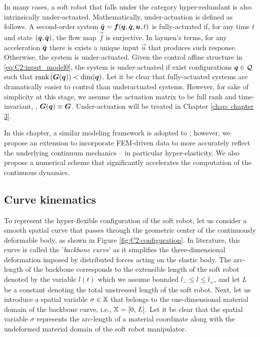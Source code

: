 {\begin{asm}
In many cases, a soft robot that falls under the category hyper-redundant is also intrinsically under-actuated. Mathematically, under-actuation is defined as follows. A second-order system $\ddot{{\boldsymbol{q}}} = \boldsymbol{f}({\boldsymbol{q}},\dot{{\boldsymbol{q}}},\boldsymbol{u},t)$ is fully-actuated if, for any time $t$ and state $({\boldsymbol{q}},\dot{{\boldsymbol{q}}})$, the flow map $\vec{f}$ is surjective. In laymen's terms, for any acceleration $\ddot{{\boldsymbol{q}}}$ there is exists a unique input $\vec{u}$ that produces such response. Otherwise, the system is under-actuated. Given the control affine structure in \eqref{eq:C2:input_model0}, the system is under-actuated if exist configurations ${\boldsymbol{q}} \in \mathcal{Q}$
such that $\textnormal{rank} \left( \boldsymbol{G}({\boldsymbol{q}}) \right) < \text{dim}({\boldsymbol{q}})$.
Let it be clear that fully-actuated systems are dramatically easier to control than underactuated systems. However, for sake of simplicity at this stage, we assume the actuation matrix to be full rank and time-invariant, \ie, $\boldsymbol{G}({\boldsymbol{q}}) \equiv \boldsymbol{G}$. Under-actuation will be treated in Chapter \ref{chap: chapter 3}.
\end{asm}

%
In this chapter, a similar modeling framework is adopted to \cite{Mochiyama2003}; however, we propose an extension to incorporate FEM-driven data to more accurately reflect the underlying continuum mechanics -- in particular hyper-elasticity. We also propose a numerical scheme that significantly accelerates the computation of the continuous dynamics.

\subsection{Curve kinematics}
\noindent To represent the hyper-flexible configuration of the soft robot, let us consider a smooth spatial curve that passes through the geometric center of the continuously deformable body, as shown in Figure \ref{fig:C2:configuration}. {In literature, this curve is called} the '\textit{backbone curve}' as it simplifies the three-dimensional deformation imposed by distributed forces acting on the elastic body. The arc-length of the backbone corresponds to the extensible length of the soft robot denoted by the variable $l(t)$ which we assume bounded ${l}_{-}\le l \le {l}_{+}$, and let $L$ be a constant denoting the {total unstressed} length of the soft robot. Next, let us introduce a spatial variable $\sigma \in \mathbb{X}$ that belongs to the one-dimensional material domain of the backbone curve, i.e., $\mathbb{X} = [0,\, L]$. Let it be clear that the spatial variable $\sigma$
represents the arc-length of a material coordinate along with the undeformed material domain of the soft robot manipulator.

}
